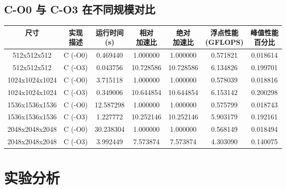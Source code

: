 \documentclass{SYSUReport}
\begin{document}
\subsection{ C-O0 与 C-O3 在不同规模对比}
\begin{table}[h]
\centering
\small
\begin{tabular}{|c|c|c|c|c|c|c|}
\hline
尺寸 & \shortstack{实现\\描述} & \shortstack{运行时间\\ (s)} & \shortstack{相对\\加速比} & \shortstack{绝对\\加速比} & \shortstack{浮点性能\\ (GFLOPS)} & \shortstack{峰值性能\\百分比} \\
\hline
512x512x512 & C (-O0) & 0.469440 & 1.000000 & 1.000000 & 0.571821 & 0.018614 \\
\hline
512x512x512 & C (-O3) & 0.043756 & 10.728586 & 10.728586 & 6.134826 & 0.199701 \\
\hline
1024x1024x1024 & C (-O0) & 3.715118 & 1.000000 & 1.000000 & 0.578039 & 0.018816 \\
\hline
1024x1024x1024 & C (-O3) & 0.349006 & 10.644854 & 10.644854 & 6.153142 & 0.200298 \\
\hline
1536x1536x1536 & C (-O0) & 12.587298 & 1.000000 & 1.000000 & 0.575799 & 0.018743 \\
\hline
1536x1536x1536 & C (-O3) & 1.227772 & 10.252146 & 10.252146 & 5.903179 & 0.192161 \\
\hline
2048x2048x2048 & C (-O0) & 30.238304 & 1.000000 & 1.000000 & 0.568149 & 0.018494 \\
\hline
2048x2048x2048 & C (-O3) & 3.992449 & 7.573874 & 7.573874 & 4.303090 & 0.140075 \\
\hline
\end{tabular}
\end{table}

\newpage
\section{实验分析}
\end{document}
